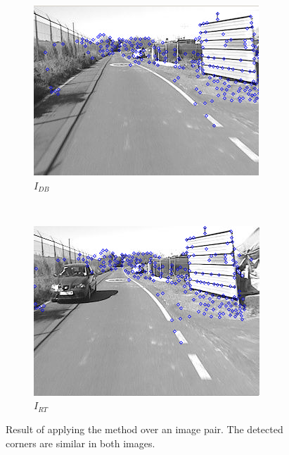 \begin{figure}[h!]
        \centering
        \begin{subfigure}[b]{0.45\textwidth}
                \centering
                \includegraphics[width=\textwidth]{featuresShi1}
                \caption{$I_{DB}$}\label{fig:cp01_features_shi_1}
        \end{subfigure}%
        ~ %
        \begin{subfigure}[b]{0.45\textwidth}
                \centering
                \includegraphics[width=\textwidth]{featuresShi2}
                \caption{$I_{RT}$}\label{fig:cp01_features_shi_2}
        \end{subfigure}%
        \caption{Result of applying the \cite{shi1994good} method over an image pair. The detected corners are similar in both images.}\label{fig:cp01_shi_tomasi_features}
\end{figure}

